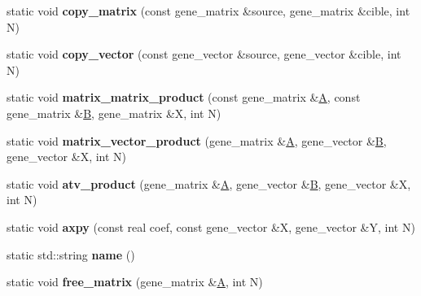 \begin{DoxyCompactItemize}
static void {\bfseries copy\+\_\+matrix} (const gene\+\_\+matrix \&source, gene\+\_\+matrix \&cible, int N)
\item 
\mbox{\label{classtvmet__interface_a897b4b39e7080d4afed99c3153db8f4f}} 
static void {\bfseries copy\+\_\+vector} (const gene\+\_\+vector \&source, gene\+\_\+vector \&cible, int N)
\item 
\mbox{\label{classtvmet__interface_a35413605a24d19868bded3dc0a64da16}} 
static void {\bfseries matrix\+\_\+matrix\+\_\+product} (const gene\+\_\+matrix \&\hyperlink{group___core___module_class_eigen_1_1_matrix}{A}, const gene\+\_\+matrix \&\hyperlink{group___core___module_class_eigen_1_1_matrix}{B}, gene\+\_\+matrix \&X, int N)
\item 
\mbox{\label{classtvmet__interface_ad83c1e64a297e784e66e9d8ff76f4ac7}} 
static void {\bfseries matrix\+\_\+vector\+\_\+product} (gene\+\_\+matrix \&\hyperlink{group___core___module_class_eigen_1_1_matrix}{A}, gene\+\_\+vector \&\hyperlink{group___core___module_class_eigen_1_1_matrix}{B}, gene\+\_\+vector \&X, int N)
\item 
\mbox{\label{classtvmet__interface_a81f982aac7370b0b7bb9fd8d70982e36}} 
static void {\bfseries atv\+\_\+product} (gene\+\_\+matrix \&\hyperlink{group___core___module_class_eigen_1_1_matrix}{A}, gene\+\_\+vector \&\hyperlink{group___core___module_class_eigen_1_1_matrix}{B}, gene\+\_\+vector \&X, int N)
\item 
\mbox{\label{classtvmet__interface_ad66cc3890a0d80b5fdbc78bffeb00af3}} 
static void {\bfseries axpy} (const real coef, const gene\+\_\+vector \&X, gene\+\_\+vector \&Y, int N)
\item 
\mbox{\label{classtvmet__interface_ad1fa4a4965bfb8ddcd47a5dc1b048f60}} 
static std\+::string {\bfseries name} ()
\item 
\mbox{\label{classtvmet__interface_a32e64a2884074b3df6dda7dfa892ac3e}} 
static void {\bfseries free\+\_\+matrix} (gene\+\_\+matrix \&\hyperlink{group___core___module_class_eigen_1_1_matrix}{A}, int N)
\item 
\mbox{\label{classtvmet__interface_ac64e06e9534f5036a49ff88bb9c995f9}} 

\end{DoxyCompactItemize}
